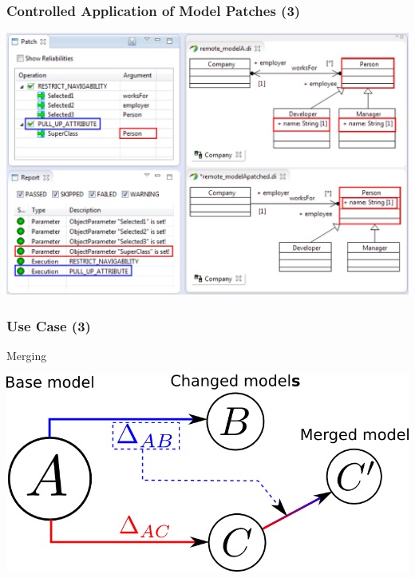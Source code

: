\begin{frame}[noframenumbering]
  \frametitle{Controlled Application of Model Patches (3)}
  \begin{center}
  \includegraphics[scale=0.45]{images/patch_01_3}
  \end{center}
\end{frame}
\begin{frame}
\frametitle{Use Case (3)}
\begin{block}{Merging}
  \begin{center}
\includegraphics[scale=0.5]{images/applyPatchMerge}
  \end{center}
\end{block}
\end{frame}
